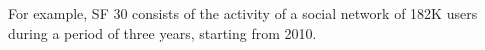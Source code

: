 For example, SF 30 consists of the activity of a social network of 182K users
during a period of three years, starting from 2010.


